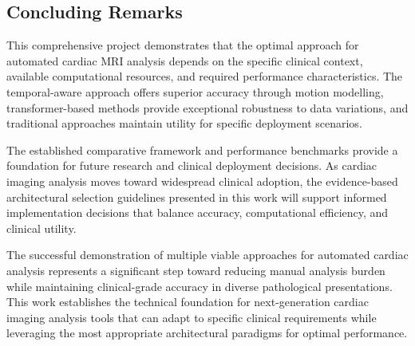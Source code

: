 \documentclass[twoside,11pt]{article}
\begin{document}
  \subsection{Concluding Remarks}
  
  This comprehensive project demonstrates that the optimal approach for automated cardiac MRI analysis depends on the specific clinical context, available computational resources, and required performance characteristics. The temporal-aware approach offers superior accuracy through motion modelling, transformer-based methods provide exceptional robustness to data variations, and traditional approaches maintain utility for specific deployment scenarios.
  
  The established comparative framework and performance benchmarks provide a foundation for future research and clinical deployment decisions. As cardiac imaging analysis moves toward widespread clinical adoption, the evidence-based architectural selection guidelines presented in this work will support informed implementation decisions that balance accuracy, computational efficiency, and clinical utility.
  
  The successful demonstration of multiple viable approaches for automated cardiac analysis represents a significant step toward reducing manual analysis burden while maintaining clinical-grade accuracy in diverse pathological presentations. This work establishes the technical foundation for next-generation cardiac imaging analysis tools that can adapt to specific clinical requirements while leveraging the most appropriate architectural paradigms for optimal performance.

  \newpage

  \vskip 0.2in
\end{document}

